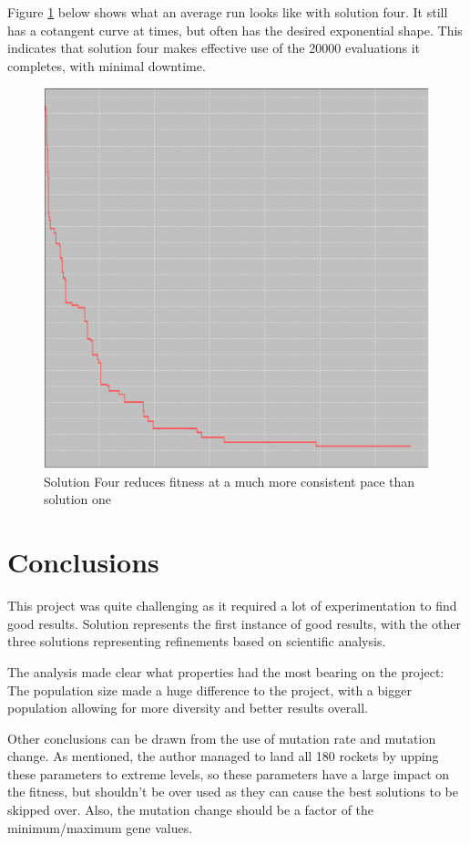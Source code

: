 \documentclass[sigconf]{acmart}
\begin{document}
Figure \ref{exponential} below shows what an average run looks like with solution four. It still has a cotangent curve at times, but often has the desired exponential shape. This indicates that solution four makes effective use of the 20000 evaluations it completes, with minimal downtime.

\begin{figure}[H]
\includegraphics[width=\columnwidth]{Exponential.png}
\caption[width=\columnwidth]{Solution Four reduces fitness at a much more consistent pace than solution one} \label{exponential}
\end{figure}

\section{Conclusions}
This project was quite challenging as it required a lot of experimentation to find good results. Solution represents the first instance of good results, with the other three solutions representing refinements based on scientific analysis.

The analysis made clear what properties had the most bearing on the project: The population size made a huge difference to the project, with a bigger population allowing for more diversity and better results overall.

Other conclusions can be drawn from the use of mutation rate and mutation change. As mentioned, the author managed to land all 180 rockets by upping these parameters to extreme levels, so these parameters have a large impact on the fitness, but shouldn't be over used as they can cause the best solutions to be skipped over. Also, the mutation change should be a factor of the minimum/maximum gene values.
\end{document}

